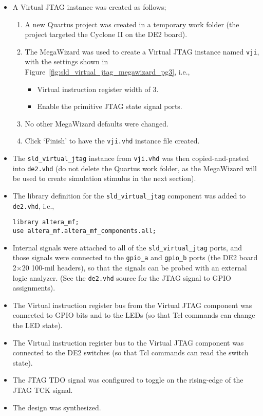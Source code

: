 \documentclass[10pt,twoside]{article}
\begin{document}
\begin{itemize}
\item A Virtual JTAG instance was created as follows;
\begin{enumerate}
\item A new Quartus project was created in a temporary work folder
(the project targeted the Cyclone II on the DE2 board).
\item The MegaWizard was used to create a Virtual JTAG instance
named \verb+vji+, with the settings shown in 
Figure~\ref{fig:sld_virtual_jtag_megawizard_pg3}, i.e.,
\begin{itemize}
\item Virtual instruction register width of 3.
\item Enable the primitive JTAG state signal ports.
\end{itemize}
\item No other MegaWizard defaults were changed.
\item Click `Finish' to have the \verb+vji.vhd+ instance file
created.
\end{enumerate}
%
\item The \verb+sld_virtual_jtag+ instance from \verb+vji.vhd+
was then copied-and-pasted into \verb+de2.vhd+
(do not delete the Quartus work folder, as the MegaWizard
will be used to create simulation stimulus in the next section). 
\item The library definition for the \verb+sld_virtual_jtag+
component was added to \verb+de2.vhd+, i.e., 
%
\begin{verbatim}
library altera_mf;
use altera_mf.altera_mf_components.all;
\end{verbatim}
%
\item Internal signals were attached to all of the \verb+sld_virtual_jtag+
ports, and those signals were connected to the \verb+gpio_a+ and
\verb+gpio_b+ ports (the DE2 board 2$\times$20 100-mil headers),
so that the signals can be probed with an external logic
analyzer. (See the \verb+de2.vhd+ source for the JTAG signal to GPIO
assignments).
\item The Virtual instruction register bus from the Virtual
JTAG component was connected to GPIO bits and to the LEDs
(so that Tcl commands can change the LED state).
\item The Virtual instruction register bus to the Virtual
JTAG component was connected to the DE2 switches
(so that Tcl commands can read the switch state).
\item The JTAG TDO signal was configured to toggle on
the rising-edge of the JTAG TCK signal.
\item The design was synthesized.
\end{itemize}
\end{document}
